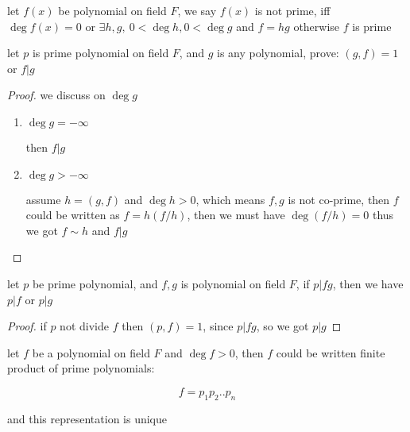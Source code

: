 \begin{definition}
    let $f(x)$ be polynomial on field $F$, we say $f(x)$ is not prime, iff $\deg f(x) = 0$
    or $\exists h,g,\: 0 < \deg h, 0 < \deg g $ and $f = hg$
    otherwise $f$ is prime
\end{definition}

\begin{exercise}
    let $p$ is prime polynomial on field $F$, and $g$ is any polynomial,
    prove: $(g,f) = 1$ or $f | g$
\end{exercise}

\begin{proof}
    we discuss on $\deg g$

    \begin{enumerate}
        \item $\deg g = -\infty$

        then $f|g$

        \item $\deg g > -\infty$

        assume $h =(g,f)$ and $\deg h > 0$, which means $f,g$ is not co-prime, 
        then $f$ could be written as $f = h (f/h)$, then we must have $\deg (f/h) = 0$
        thus we got $f \sim h$ and $f | g$

        
    \end{enumerate}
\end{proof}

\begin{exercise}
    let $p$ be prime polynomial, and $f,g $ is polynomial on field $F$, if $p | fg$, then we have
    $p | f$ or $p | g$
\end{exercise}

\begin{proof}
    if $p$ not divide $f$ then $(p,f) = 1$, since $p|fg$, so we got $p|g$
\end{proof}


\begin{exercise}
let $f$ be a polynomial on field $F$ and $\deg f > 0$, then $f$ could be written finite product of prime polynomials:

\[
    f = p_1p_2..p_n
\]

and this representation is unique
\end{exercise}

